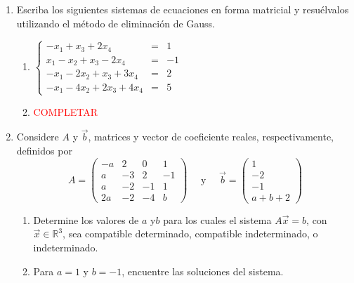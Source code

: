 \documentclass[11pt]{article}
\newcommand{\RR}{\mathbb{R}}
\begin{document}
\begin{enumerate}

\item Escriba los siguientes sistemas de ecuaciones en
  forma matricial y resu\'elvalos utilizando el m\'etodo de eliminaci\'on
  de Gauss.
  \begin{multicols}{2}
    \begin{enumerate}
    \item
      $\left\{
        \begin{array}{rcl}
          -x_{1}+x_{3}+2x_{4}        & =&1\\
          x_{1}-x_{2}+x_{3}-2x_{4}     &  =&-1\\
          -x_{1}-2x_{2}+x_{3}+3x_{4}   &  =&2\\
          -x_{1}-4x_{2}+2x_{3}+4x_{4}  &  =&5
        \end{array}
      \right.
      $
    \item
      \textcolor{red}{COMPLETAR}
    \end{enumerate}
  \end{multicols}

  
\item Considere $A$ y $\vec{b}$, matrices y vector de coeficiente reales,
  respectivamente, definidos por
  \[
    A=
    \begin{pmatrix}
      -a & 2 & 0 & 1\\
      a & -3 & 2 & -1\\
      a & -2 & -1 & 1\\
      2a & -2 & -4 & b
    \end{pmatrix}
    \quad
    \text{ y }
    \quad
    \vec{b}=
    \begin{pmatrix}
      1\\
      -2\\
      -1\\
      a+b+2
    \end{pmatrix}
  \]
  
  \begin{enumerate}
  \item Determine los valores de $a$ y$b$ para los cuales el sistema
    $A\vec{x}=b$, con $\vec{x}\in\RR^3$, sea compatible determinado,
    compatible indeterminado, o indeterminado.
    
  \item Para $a=1$ y $b=-1$, encuentre las soluciones del sistema.
  \end{enumerate}
  

\end{enumerate}
\end{document}
